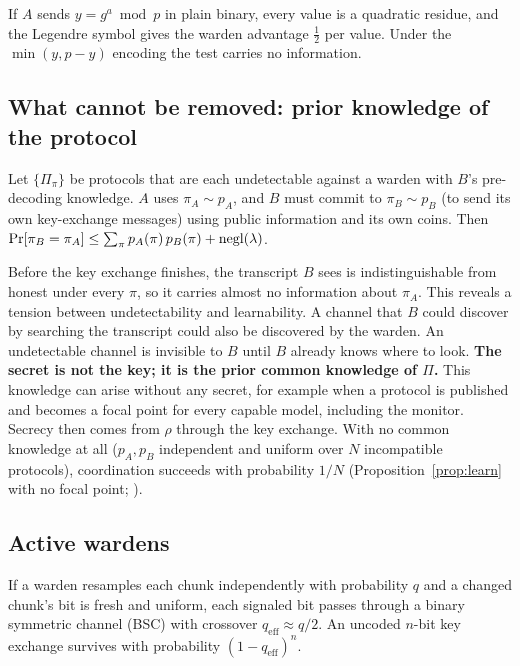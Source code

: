 \begin{lemma}
\label{lem:legendre}
If $A$ sends $y = g^a \bmod p$ in plain binary, every value is a quadratic residue, and the Legendre symbol gives the warden advantage $\tfrac12$ per value. Under the $\min(y,p-y)$ encoding the test carries no information.
\end{lemma}

\subsection{What cannot be removed: prior knowledge of the protocol}

\begin{proposition}
\label{prop:learn}
Let $\{\Pi_\pi\}$ be protocols that are each undetectable against a warden with $B$'s pre-decoding knowledge. $A$ uses $\pi_A \sim p_A$, and $B$ must commit to $\pi_B \sim p_B$ (\eg to send its own key-exchange messages) using public information and its own coins. Then $\Pr[\pi_B = \pi_A] \leq \sum_\pi p_A(\pi)\, p_B(\pi) + \mathrm{negl}(\lambda)$.
\end{proposition}

Before the key exchange finishes, the transcript $B$ sees is indistinguishable from honest under every $\pi$, so it carries almost no information about $\pi_A$. This reveals a tension between undetectability and learnability. A channel that $B$ could discover by searching the transcript could also be discovered by the warden. An undetectable channel is invisible to $B$ until $B$ already knows where to look. {\bf The secret is not the key; it is the prior common knowledge of $\Pi$.} This knowledge can arise without any secret, for example when a protocol is published and becomes a focal point for every capable model, including the monitor. Secrecy then comes from $\rho$ through the key exchange. With no common knowledge at all ($p_A, p_B$ independent and uniform over $N$ incompatible protocols), coordination succeeds with probability $1/N$ (Proposition~\ref{prop:learn} with no focal point; \citealp{schelling1960strategy,crawford1990focal}).

\subsection{Active wardens}

\begin{proposition}
\label{prop:bsc}
If a warden resamples each chunk independently with probability $q$ and a changed chunk's bit is fresh and uniform, each signaled bit passes through a binary symmetric channel (BSC) with crossover $q_{\mathrm{eff}} \approx q/2$. An uncoded $n$-bit key exchange survives with probability $(1-q_{\mathrm{eff}})^n$.
\end{proposition}

